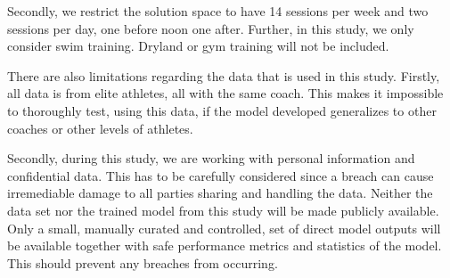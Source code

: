Secondly, we restrict the solution space to have 14 sessions per week and two sessions per day, one before noon one after. 
Further, in this study, we only consider swim training.
Dryland or gym training will not be included.

There are also limitations regarding the data that is used in this study.
Firstly, all data is from elite athletes, all with the same coach.
This makes it impossible to thoroughly test, using this data, if the model developed generalizes to other coaches or other levels of athletes.

Secondly, during this study, we are working with personal information and confidential data.
This has to be carefully considered since a breach can cause irremediable damage to all parties sharing and handling the data.
Neither the data set nor the trained model from this study will be made publicly available.
Only a small, manually curated and controlled, set of direct model outputs will be available together with safe performance metrics and statistics of the model.
This should prevent any breaches from occurring.











